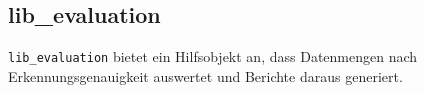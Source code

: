 \subsection{lib\_evaluation}
\texttt{lib\_evaluation} bietet ein Hilfsobjekt an, dass Datenmengen nach Erkennungsgenauigkeit auswertet und Berichte daraus generiert.